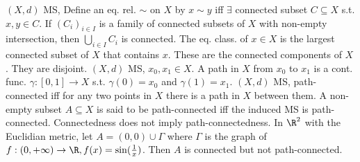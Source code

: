  $(X, d)$ MS,
Define an eq. rel. $\sim$ on $X$ by $x \sim y$ iff $\exists$ connected subset $C \subseteq X$ s.t. $x,y \in C$.
 If $(C_i)_{i \in I}$ is a family of connected subsets of $X$
with non-empty intersection, then $\bigcup_{i \in I} C_i$ is connected.
 The eq. class. of $x \in X$ is the largest connected subset of $X$ that contains $x$.
These are the connected components of $X$. They are disjoint.
$(X, d)$ MS, $x_0, x_1 \in X$.
A path in $X$ from $x_0$ to $x_1$ is a cont. func.
$\gamma: [0,1] \to X$ s.t. $\gamma(0)=x_0$ and $\gamma(1)=x_1$.
$(X,d)$ MS, path-connected iff for any two points in $X$ there is a path in $X$ between them.
A non-empty subset $A \subseteq X$ is said to be path-connected iff the induced MS is path-connected.
Connectedness does not imply path-connectedness.
In $\R^2$ with the Euclidian metric, let $A = (0,0) \cup \Gamma$ where $\Gamma$ is the graph of
$f: (0, +\infty) \to \R, f(x) = \sin(\frac{1}{x})$.
Then $A$ is connected but not path-connected.
